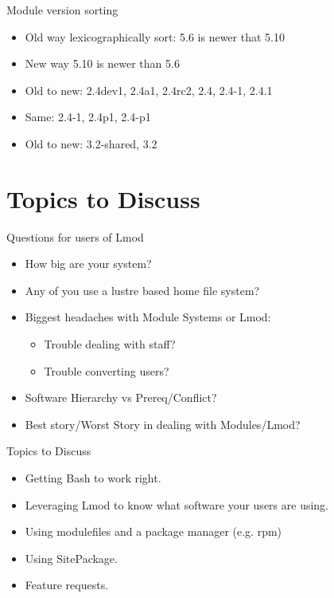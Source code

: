 \documentclass{beamer}
\begin{document}
\begin{frame}{Module version sorting}
  \begin{itemize}
    \item Old way lexicographically sort: 5.6 is newer that 5.10
    \item New way 5.10 is newer than 5.6
    \item Old to new: 2.4dev1, 2.4a1, 2.4rc2, 2.4, 2.4-1, 2.4.1
    \item Same: 2.4-1, 2.4p1, 2.4-p1
    \item Old to new: 3.2-shared, 3.2
  \end{itemize}
\end{frame}

\section{Topics to Discuss}

\begin{frame}{Questions for users of Lmod}
  \begin{itemize}
    \item How big are your system?
    \item Any of you use a lustre based home file system?
    \item Biggest headaches with Module Systems or Lmod:
      \begin{itemize}
        \item Trouble dealing with staff?
        \item Trouble converting users?
      \end{itemize}
    \item Software Hierarchy vs Prereq/Conflict?
    \item Best story/Worst Story in dealing with Modules/Lmod?
  \end{itemize}
\end{frame}

\begin{frame}{Topics to Discuss}
  \begin{itemize}
    \item Getting Bash to work right.
    \item Leveraging Lmod to know what software your users are using.
    \item Using modulefiles and a package manager (e.g. rpm)
    \item Using SitePackage.
    \item Feature requests.
  \end{itemize}
\end{frame}
\end{document}
